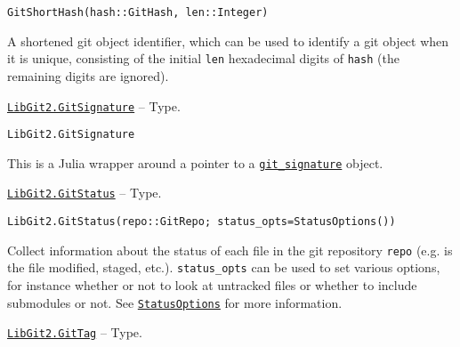 \begin{adjustwidth}{2em}{0pt}


\begin{verbatim}
GitShortHash(hash::GitHash, len::Integer)
\end{verbatim}

A shortened git object identifier, which can be used to identify a git object when it is unique, consisting of the initial \texttt{len} hexadecimal digits of \texttt{hash} (the remaining digits are ignored).



\end{adjustwidth}
\hypertarget{16780673881553092129}{} 
\hyperlink{16780673881553092129}{\texttt{LibGit2.GitSignature}}  -- {Type.}

\begin{adjustwidth}{2em}{0pt}


\begin{verbatim}
LibGit2.GitSignature
\end{verbatim}

This is a Julia wrapper around a pointer to a \href{https://libgit2.org/libgit2/\#HEAD/type/git\_signature}{\texttt{git\_signature}} object.



\end{adjustwidth}
\hypertarget{5023272497907128319}{} 
\hyperlink{5023272497907128319}{\texttt{LibGit2.GitStatus}}  -- {Type.}

\begin{adjustwidth}{2em}{0pt}


\begin{verbatim}
LibGit2.GitStatus(repo::GitRepo; status_opts=StatusOptions())
\end{verbatim}

Collect information about the status of each file in the git repository \texttt{repo} (e.g. is the file modified, staged, etc.). \texttt{status\_opts} can be used to set various options, for instance whether or not to look at untracked files or whether to include submodules or not. See \hyperlink{15761804013497693135}{\texttt{StatusOptions}} for more information.



\end{adjustwidth}
\hypertarget{10467695058580020738}{} 
\hyperlink{10467695058580020738}{\texttt{LibGit2.GitTag}}  -- {Type.}


